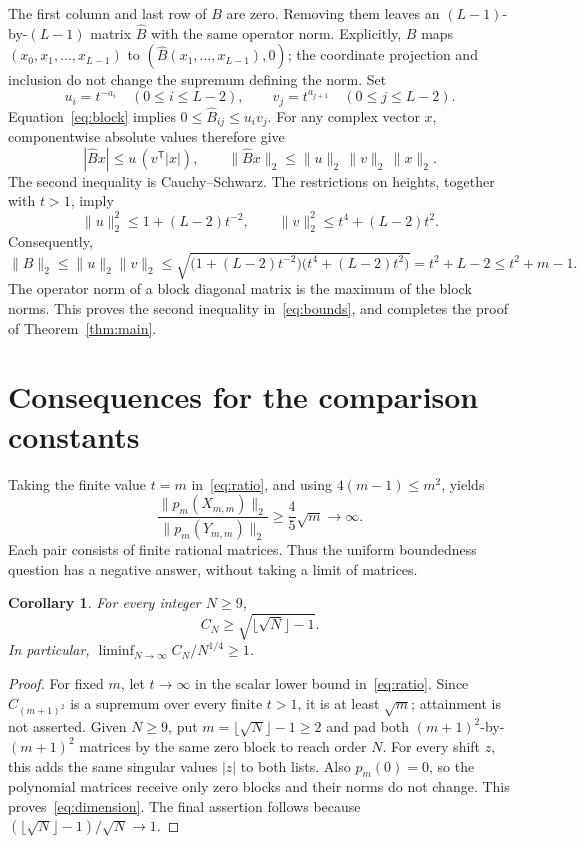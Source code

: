 \documentclass[11pt,a4paper]{article}
\newtheorem{corollary}[theorem]{Corollary}
\newcommand{\norm}[1]{\lVert #1\rVert_2}
\begin{document}
The first column and last row of $B$ are zero. Removing them leaves an
$(L-1)$-by-$(L-1)$ matrix $\widehat B$ with the same operator norm.
Explicitly, $B$ maps $(x_0,x_1,\ldots,x_{L-1})$ to
$(\widehat B(x_1,\ldots,x_{L-1}),0)$; the coordinate projection and
inclusion do not change the supremum defining the norm.
Set
\[
 u_i=t^{-a_i}\quad(0\le i\le L-2),\qquad
 v_j=t^{a_{j+1}}\quad(0\le j\le L-2).
\]
Equation~\eqref{eq:block} implies $0\le\widehat B_{ij}\le u_i v_j$.
For any complex vector $x$, componentwise absolute values therefore give
\[
 |\widehat Bx|\le u\,(v^{\mathsf T}|x|),\qquad
 \norm{\widehat Bx}\le\norm{u}\,\norm{v}\,\norm{x}.
\]
The second inequality is Cauchy--Schwarz. The restrictions on heights,
together with $t>1$, imply
\[
 \norm{u}^2\le1+(L-2)t^{-2},\qquad
 \norm{v}^2\le t^4+(L-2)t^2.
\]
Consequently,
\[
 \norm{B}\le\norm{u}\norm{v}
 \le\sqrt{\bigl(1+(L-2)t^{-2}\bigr)\bigl(t^4+(L-2)t^2\bigr)}
 =t^2+L-2\le t^2+m-1.
\]
The operator norm of a block diagonal matrix is the maximum of the block
norms. This proves the second inequality in~\eqref{eq:bounds}, and
completes the proof of Theorem~\ref{thm:main}.

\section{Consequences for the comparison constants}
Taking the finite value $t=m$ in~\eqref{eq:ratio}, and using
$4(m-1)\le m^2$, yields
\begin{equation}\label{eq:finite}
 \frac{\norm{p_m(X_{m,m})}}{\norm{p_m(Y_{m,m})}}
 \ge \frac45\sqrt m\longrightarrow\infty.
\end{equation}
Each pair consists of finite rational matrices. Thus the uniform boundedness
question has a negative answer, without taking a limit of matrices.

\begin{corollary}\label{cor:dimension}
For every integer $N\ge9$,
\begin{equation}\label{eq:dimension}
 C_N\ge\sqrt{\lfloor\sqrt N\rfloor-1}.
\end{equation}
In particular, $\liminf_{N\to\infty}C_N/N^{1/4}\ge1$.
\end{corollary}
\begin{proof}
For fixed $m$, let $t\to\infty$ in the scalar lower bound
in~\eqref{eq:ratio}. Since $C_{(m+1)^2}$ is a supremum over every finite
$t>1$, it is at least $\sqrt m$; attainment is not asserted.
Given $N\ge9$, put $m=\lfloor\sqrt N\rfloor-1\ge2$ and pad both
$(m+1)^2$-by-$(m+1)^2$ matrices by the same zero block to reach order $N$.
For every shift $z$, this adds the same singular values $|z|$ to both lists.
Also $p_m(0)=0$, so the polynomial matrices receive only zero blocks and
their norms do not change. This proves~\eqref{eq:dimension}.
The final assertion follows because
$(\lfloor\sqrt N\rfloor-1)/\sqrt N\to1$.
\end{proof}
\end{document}
